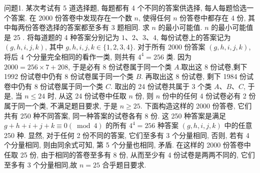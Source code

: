 
问题1. 某次考试有 5 道选择题, 每题都有 4 个不同的答案供选择, 每人每题恰选一个答案.
在 2000 份答卷中发现存在一个数 $n$, 使得任何 $n$ 份答卷中都存在 4 份, 其中每两份答卷选择的答案都至多有 3 题相同.
求 $n$ 的最小可能值.
$n$ 的最小可能值是 25 . 将每道题的 4 种答案分别记为 $1 、 2 、 3 、 4$, 每份试卷上的答案记为 $(g, h, i, j, k)$, 其中 $g, h, i, j, k \in\{1,2,3,4\}$. 对于所有 2000 份答案 $(g, h, i, j, k)$, 将后 4 个分量完全相同的看作一类, 则共有 $4^4=256$ 类.
因为 $2000=256 \times 7+208$, 于是必有 8 份试卷属于同一个类 $A$.取出这 8 份试卷,剩下 1992 份试卷中仍有 8 份试卷属于同一个类 $B$. 再取出这 8 份试卷, 剩下 1984 份试卷中仍有 8 份试卷属于同一个类 $C$. 取出的 24 份试卷共属于 3 个类 $A 、 B 、 C$, 于是, 当 $n \leqslant 24$ 时, 从这 24 份试卷中任取 $n$ 份,
则 $n$ 份中的任何 4 份试卷必有 2 份属于同一个类, 不满足题目要求, 于是 $n \geqslant 25$.
下面构造这样的 2000 份答卷, 它们共有 250 种不同答案, 同一种答案的试卷各有 8 份.
这 250 种答案是满足 $g+h+i+j+k \equiv 0(\bmod 4)$ 的所有 $4^4=256$ 种答案 $(g, h, i, j, k)$ 中的任意 250 种.
显然, 对于任何 2 份不同的答案, 它们至多有 3 个分量相同, 否则, 若有 4 个分量相同, 则由同余式可知, 第 5 个分量也相同, 矛盾.
在这样的 2000 份答卷中任取 25 份, 由于相同的答卷至多有 8 份, 从而至少有 4 份试卷是两两不同的, 它们至多有 3 个分量相同,故 $n=25$ 合乎题目要求.



